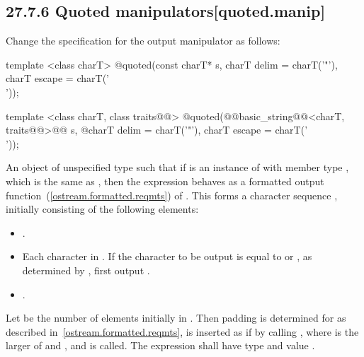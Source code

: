 \documentclass[ebook,11pt,article]{memoir}
\begin{document}
\subsection{27.7.6 Quoted manipulators[quoted.manip]}
Change the specification for the output manipulator as follows:
\begin{removedblock}
\begin{itemdecl}
template <class charT>
  @\unspec@ quoted(const charT* s, charT delim = charT('"'), charT escape = charT('\\'));
\end{itemdecl}
\end{removedblock}
\begin{itemdecl}
template <class charT, class traits@@>
  @\unspec@ quoted(@@basic_string@@<charT, traits@@>@\del{\&}@ s,
  @\itcorr@                   charT delim = charT('"'), charT escape = charT('\\'));
\end{itemdecl}

\begin{itemdescr}
\pnum
\returns An object of unspecified type such that if  is an instance
of  with member type , which is the same as , then the expression
behaves as a formatted output function~(\ref{ostream.formatted.reqmts})
of . This forms a character sequence , initially
consisting of the following elements:
\begin{itemize}
\item {}.
\item Each character in . If the character to be output is equal to
 or , as determined by , first
output .
\item {}.
\end{itemize}
Let  be the number of elements initially in .
Then padding is determined for  as described
in~\ref{ostream.formatted.reqmts},  is inserted as if by calling
, where  is the larger of
 and , and  is called.
The expression  shall have type
 and value .
\end{itemdescr}
\end{document}
